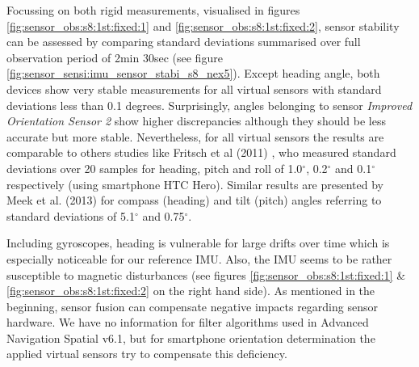 \documentclass[review]{elsarticle}
\begin{document}
Focussing on both rigid measurements, visualised in figures \ref{fig:sensor_obs:s8:1st:fixed:1} and \ref{fig:sensor_obs:s8:1st:fixed:2}, sensor stability can be assessed by comparing standard deviations summarised over full observation period of 2min 30sec (see figure \ref{fig:sensor_sensi:imu_sensor_stabi_s8_nex5}). Except heading angle, both devices show very stable measurements for all virtual sensors with standard deviations less than 0.1 degrees. Surprisingly, angles belonging to sensor \textit{Improved Orientation Sensor 2} show higher discrepancies although they should be less accurate but more stable. Nevertheless, for all virtual sensors the results are comparable to others studies like Fritsch et al (2011) \cite{Fritsch2011}, who measured standard deviations over 20 samples for heading, pitch and roll of 1.0$^\circ$, 0.2$^\circ$ and 0.1$^\circ$ respectively (using smartphone HTC Hero). Similar results are presented by Meek et al. (2013) \cite{Meek2013} for compass (heading) and tilt (pitch) angles referring to standard deviations of 5.1$^\circ$ and 0.75$^\circ$.

Including gyroscopes, heading is vulnerable for large drifts over time \cite{Kok2017} which is 
especially noticeable for our reference \gls{IMU}. Also, the \gls{IMU} seems to be rather susceptible to magnetic disturbances (see figures \ref{fig:sensor_obs:s8:1st:fixed:1} \& \ref{fig:sensor_obs:s8:1st:fixed:2} on the right hand side). As mentioned in the beginning, sensor fusion can compensate negative impacts regarding sensor hardware. We have no information for filter algorithms used in Advanced Navigation Spatial v6.1, but for smartphone orientation determination the applied virtual sensors try to compensate this deficiency. 
\end{document}
